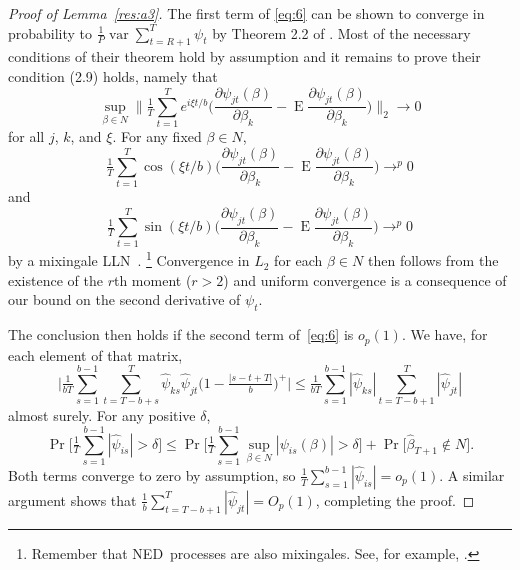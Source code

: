 \documentclass[12pt,fleqn]{article}
\theoremstyle{definition}
\DeclareMathOperator{\E}{E}
\DeclareMathOperator{\var}{var}
\DeclareMathOperator{\pr}{Pr}
\newcommand{\osum}[1]{\sum_{#1=R+1}^T}
\newcommand{\lln}{LLN}
\newcommand{\ned}{NED}
\begin{document}
\begin{proof}[Proof of Lemma~\ref{res:a3}]
  The first term of \eqref{eq:6} can be shown to converge in
  probability to $\tfrac{1}{P} \var \osum{t} \psi_t$ by Theorem 2.2 of
  \citet{JoD:00}.  Most of the necessary conditions of their theorem
  hold by assumption and it remains to prove their condition (2.9)
  holds, namely that
  \begin{equation}\label{eq:2}
    \sup_{\beta \in N} \Bigg\lVert \tfrac{1}{T} \sum_{t=1}^T e^{i \xi t/b} 
    \Bigg( \frac{\partial \psi_{jt}(\beta)}{\partial \beta_k} -
          \E \frac{\partial \psi_{jt}(\beta)}{\partial \beta_k} \Bigg) 
    \Bigg\rVert_2 \to 0
  \end{equation}
  for all $j$, $k$, and $\xi$.  For any fixed $\beta \in N$,
  \begin{equation*}
    \tfrac{1}{T} \sum_{t=1}^T \cos( \xi t / b )
    \Bigg( \frac{\partial \psi_{jt}(\beta)}{\partial \beta_k} -
          \E \frac{\partial \psi_{jt}(\beta)}{\partial \beta_k} \Bigg)
    \to^p 0
  \end{equation*}
  and
  \begin{equation*}
    \tfrac{1}{T} \sum_{t=1}^T \sin( \xi t / b )
    \Bigg( \frac{\partial \psi_{jt}(\beta)}{\partial \beta_k} -
          \E \frac{\partial \psi_{jt}(\beta)}{\partial \beta_k} \Bigg)
    \to^p 0
  \end{equation*}
  by a mixingale \lln\ \citep{Dav:93}.%
\footnote{Remember that \ned\
    processes are also mixingales.  See, for example, \citet[Section
    17.2]{Dav:94}.} %
  Convergence in $L_2$ for each $\beta \in N$ then
  follows from the existence of the $r$th moment ($r > 2$) and uniform
  convergence is a consequence of our bound on the second derivative
  of $\psi_t$.

  The conclusion then holds if the second term of~\eqref{eq:6} is
  $o_p(1)$.  We have, for each element of that matrix,
  \begin{equation*}
    \Big| \tfrac{1}{bT} \sum_{s = 1}^{b - 1} \sum_{t = T - b + s}^{T}
        \hat\psi_{ks} \hat\psi_{jt}
        \big(1 - \tfrac{\lvert s - t + T\rvert}{b}\big)^+ \Big| \leq
     \tfrac{1}{b T} \sum_{s = 1}^{b - 1} |\hat\psi_{ks}|
         \sum_{t = T - b + 1}^{T} | \hat\psi_{jt} |
  \end{equation*}
  almost surely.  For any positive $\delta$,
  \begin{equation*}
    \pr \Bigg[ \tfrac{1}{T} \sum_{s = 1}^{b - 1} | \hat\psi_{is} |
              > \delta \Bigg] \leq 
    \pr \Bigg[\tfrac{1}{T} \sum_{s = 1}^{b - 1} \sup_{ \beta \in N } | \psi_{is}( \beta ) |
              > \delta \Bigg] +
    \pr \big[ \hat \beta_{T+1} \notin N \big].
  \end{equation*}
  Both terms converge to zero by assumption, so $\tfrac{1}{T} \sum_{s
    = 1}^{b - 1} |\hat\psi_{is}| = o_p(1)$.  A similar
  argument shows that $\tfrac{1}{b} \sum_{t = T - b + 1}^{T} |
  \hat\psi_{jt} | = O_p(1)$, completing the proof.
\end{proof}
\end{document}
